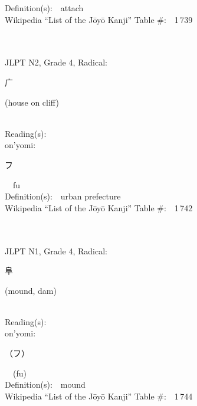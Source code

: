 \begin{multicols}{2}
Definition(s):\ \ attach \\
Wikipedia ``List of the J\=oy\=o Kanji'' Table \#:\ \ 1\,739 \\
\ \ \\
{\fontsize{34pt}{40pt}  }\ \ \\  %
{JLPT N2, Grade 4, Radical:\ \ {\begin{CJK}{UTF8}{min} 广 \end{CJK}} (house on cliff) } \\
Reading(s):\ \ \\
{\hspace*{1em}}on'yomi:\ \ \\
{\hspace*{2em}}{\begin{CJK}{UTF8}{min} フ \end{CJK}}\ \ fu\ \ \\
Definition(s):\ \ urban prefecture \\
Wikipedia ``List of the J\=oy\=o Kanji'' Table \#:\ \ 1\,742 \\
\ \ \\
{\fontsize{34pt}{40pt}  }\ \ \\  %
{JLPT N1, Grade 4, Radical:\ \ {\begin{CJK}{UTF8}{min} 阜 \end{CJK}} (mound, dam) } \\
Reading(s):\ \ \\
{\hspace*{1em}}on'yomi:\ \ \\
{\hspace*{2em}}{\begin{CJK}{UTF8}{min} （フ） \end{CJK}}\ \ (fu)\ \ \\
Definition(s):\ \ mound \\
Wikipedia ``List of the J\=oy\=o Kanji'' Table \#:\ \ 1\,744 \\
\ \ \\
{\fontsize{34pt}{40pt}  }\ \ \\  %

\end{multicols}
